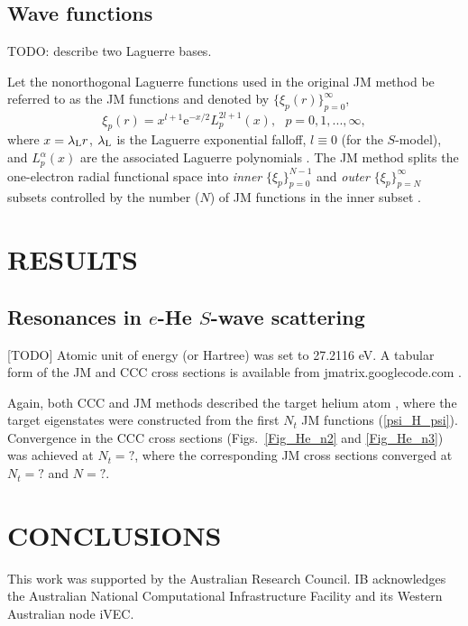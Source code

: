 \documentclass[aip
, pra
, showpacs
, aps
, twocolumn
, groupedaddress
, floatfix
]{revtex4}
\begin{document}
\subsection{Wave functions}
TODO: describe two Laguerre bases.

Let the nonorthogonal Laguerre functions used in the original JM method \cite{HY74p1201,BR76p1491}
be referred to as the JM functions and denoted by $\{\xi_p(r)\}_{p=0}^\infty$,
\[
\xi_p(r) = x^{l+1} \mbox{e}^{-x /2}
L_p^{2l+1}(x), \ \ \ p = 0, 1, ..., \infty,
\]
where $x=\lambda_{\rm L} r$,  $\lambda_{\rm L}$ is the Laguerre exponential falloff,
$l \equiv 0$ (for the $S$-model), and $L_p^{\alpha}(x)$ are the associated Laguerre polynomials \cite{abramowitz}.
The JM method splits the one-electron radial functional space into {\em inner} $\{\xi_p\}_{p=0}^{N-1}$
and {\em outer} $\{\xi_p\}_{p=N}^\infty$
subsets controlled by the number ($N$) of JM functions in the inner subset \cite{HY74p1201,BR76p1491}.




\section{RESULTS}

\subsection{Resonances in $e$-He $S$-wave scattering}


[TODO]
Atomic unit of energy (or Hartree) was set to 27.2116 eV. A tabular
form of the JM and CCC cross sections is available from jmatrix.googlecode.com .



Again, both CCC and JM methods described the target helium atom
, where the target eigenstates were constructed from the first $N_t$ JM functions (\ref{psi_H_psi}). Convergence in the CCC cross sections
(Figs.~\ref{Fig_He_n2} and \ref{Fig_He_n3}) was achieved at $N_t=?$, where the corresponding JM cross sections
converged at $N_t=?$ and $N=?$.






\section{CONCLUSIONS}





\begin{acknowledgments}
This work was supported by the Australian Research Council. IB
acknowledges the Australian National Computational Infrastructure
Facility and its Western Australian node iVEC.
\end{acknowledgments}





\end{document}
